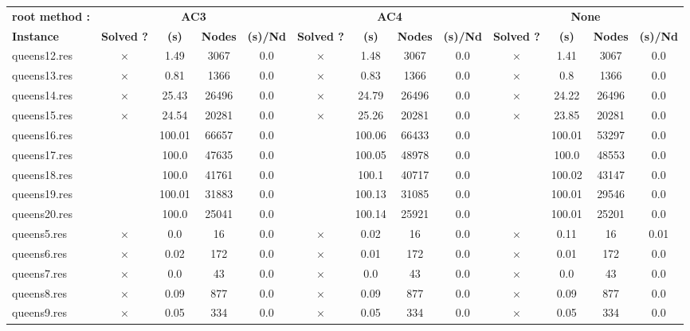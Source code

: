 \documentclass[main.tex]{subfiles}
\begin{document}
\newpage
\begin{landscape}
\begin{center}
\renewcommand{\arraystretch}{1.4} 
\begin{tabular}{lcccccccccccc}
	\hline
\textbf{root method :} & \multicolumn{4}{c}{\textbf{AC3}} & \multicolumn{4}{c}{\textbf{AC4}} & \multicolumn{4}{c}{\textbf{None}}\\
\textbf{Instance}  & \textbf{Solved ?} & \textbf{(s)} & \textbf{Nodes} & \textbf{(s)/Nd} & \textbf{Solved ?} & \textbf{(s)} & \textbf{Nodes} & \textbf{(s)/Nd} & \textbf{Solved ?} & \textbf{(s)} & \textbf{Nodes} & \textbf{(s)/Nd}\\\hline

queens12.res & $\times$ & 1.49 & 3067 & 0.0
 & $\times$ & 1.48 & 3067 & 0.0
 & $\times$ & 1.41 & 3067 & 0.0
\\
queens13.res & $\times$ & 0.81 & 1366 & 0.0
 & $\times$ & 0.83 & 1366 & 0.0
 & $\times$ & 0.8 & 1366 & 0.0
\\
queens14.res & $\times$ & 25.43 & 26496 & 0.0
 & $\times$ & 24.79 & 26496 & 0.0
 & $\times$ & 24.22 & 26496 & 0.0
\\
queens15.res & $\times$ & 24.54 & 20281 & 0.0
 & $\times$ & 25.26 & 20281 & 0.0
 & $\times$ & 23.85 & 20281 & 0.0
\\
queens16.res &  & 100.01 & 66657 & 0.0
 &  & 100.06 & 66433 & 0.0
 &  & 100.01 & 53297 & 0.0
\\
queens17.res &  & 100.0 & 47635 & 0.0
 &  & 100.05 & 48978 & 0.0
 &  & 100.0 & 48553 & 0.0
\\
queens18.res &  & 100.0 & 41761 & 0.0
 &  & 100.1 & 40717 & 0.0
 &  & 100.02 & 43147 & 0.0
\\
queens19.res &  & 100.01 & 31883 & 0.0
 &  & 100.13 & 31085 & 0.0
 &  & 100.01 & 29546 & 0.0
\\
queens20.res &  & 100.0 & 25041 & 0.0
 &  & 100.14 & 25921 & 0.0
 &  & 100.01 & 25201 & 0.0
\\
queens5.res & $\times$ & 0.0 & 16 & 0.0
 & $\times$ & 0.02 & 16 & 0.0
 & $\times$ & 0.11 & 16 & 0.01
\\
queens6.res & $\times$ & 0.02 & 172 & 0.0
 & $\times$ & 0.01 & 172 & 0.0
 & $\times$ & 0.01 & 172 & 0.0
\\
queens7.res & $\times$ & 0.0 & 43 & 0.0
 & $\times$ & 0.0 & 43 & 0.0
 & $\times$ & 0.0 & 43 & 0.0
\\
queens8.res & $\times$ & 0.09 & 877 & 0.0
 & $\times$ & 0.09 & 877 & 0.0
 & $\times$ & 0.09 & 877 & 0.0
\\
queens9.res & $\times$ & 0.05 & 334 & 0.0
 & $\times$ & 0.05 & 334 & 0.0
 & $\times$ & 0.05 & 334 & 0.0
\\
\hline\end{tabular}
\end{center}
\end{landscape}
\end{document}
